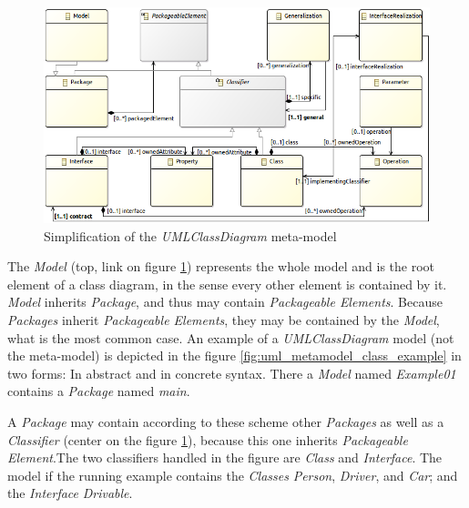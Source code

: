 \documentclass[tuberlin,cic,tc,english,noabntcite]{iiufrgs}
\begin{document}
\begin{figure}[h]
    \caption{Simplification of the \emph{UMLClassDiagram} meta-model}
    \begin{center}
        \includegraphics[width=35em]{umlClassDiagramSimple01}
    \end{center}
    \label{fig:uml_metamodel_class}
\end{figure}

The \emph{Model} (top, link on figure \ref{fig:uml_metamodel_class}) represents the whole model and is the root element of a class diagram, in the sense every other element is contained by it. \emph{Model} inherits \emph{Package}, and thus may contain \emph{Packageable Elements}. Because \emph{Packages} inherit \emph{Packageable Elements}, they may be contained by the \emph{Model}, what is the most common case. An example of a \emph{UMLClassDiagram} model (not the meta-model) is depicted in the figure \ref{fig:uml_metamodel_class_example} in two forms: In abstract and in concrete syntax. There a \emph{Model} named \emph{Example01} contains a \emph{Package} named \emph{main}.

A \emph{Package} may contain according to these scheme other \emph{Packages} as well as a \emph{Classifier} (center on the figure \ref{fig:uml_metamodel_class}), because this one inherits \emph{Packageable Element}.The two classifiers handled in the figure are \emph{Class} and \emph{Interface}. The model if the running example contains the \emph{Classes} \emph{Person}, \emph{Driver}, and \emph{Car}; and the \emph{Interface} \emph{Drivable}.

\end{document}
